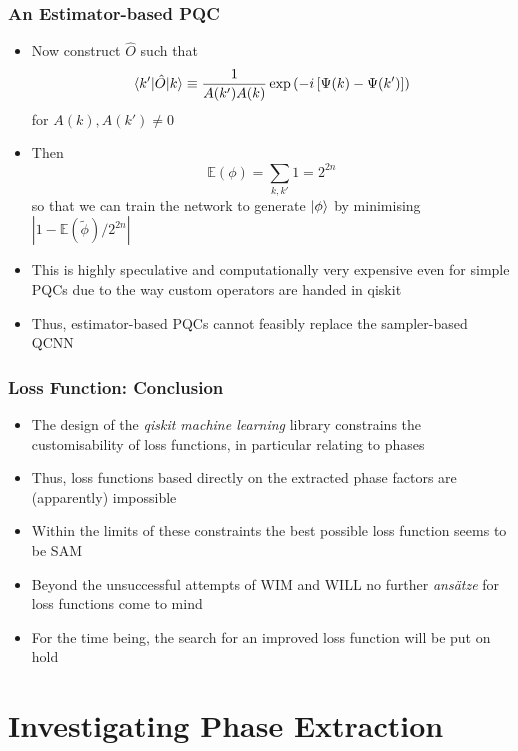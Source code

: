 \documentclass{beamer}
\begin{document}
\begin{frame}
\frametitle{An Estimator-based PQC}
\begin{itemize}
\item Now construct $\hat{O}$ such that 
\begin{equation}
\braket{k' | \hat{O} | k} \equiv \frac{1}{A(k')A(k)}  \exp \left( - i \left[ \Psi(k) - \Psi(k') \right] \right)
\end{equation}
for $A(k), A(k') \neq 0$
\item Then 
\begin{equation}
\mathbb{E}(\phi)= \sum_{k,k'} 1 =2^{2n}
\end{equation}
so that we can train the network to generate $\ket{\phi}$ by minimising $|1-\mathbb{E}(\tilde{\phi}) / 2^{2n}|$
\item \alert{This is highly speculative} and computationally very expensive even for simple PQCs due to the way custom operators are handed in qiskit
\item Thus, \alert{estimator-based PQCs cannot feasibly replace the sampler-based QCNN}
\end{itemize}
\end{frame}

\begin{frame}
\frametitle{Loss Function: Conclusion}
\begin{itemize}
\item The design of the \emph{qiskit machine learning} library \alert{constrains the customisability} of loss functions, in particular relating to phases 
\item Thus, \alert{loss functions based directly on the extracted phase} factors are (apparently) \alert{impossible} 
\item Within the limits of these constraints the \alert{best} possible loss function seems to be \alert{SAM} 
\item Beyond the unsuccessful attempts of WIM and WILL no further  \emph{ans\"atze} for loss functions come to mind 
\item For the time being, the search for an improved loss function will be \alert{put on hold}
\end{itemize}
\end{frame}

\section{Investigating Phase Extraction}
\end{document}
